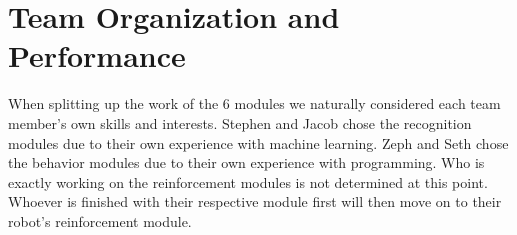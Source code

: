 \section{Team Organization and Performance}

When splitting up the work of the 6 modules we naturally considered each team member’s own skills and interests. Stephen and Jacob chose the recognition modules due to their own experience with machine learning. Zeph and Seth chose the behavior modules due to their own experience with programming. Who is exactly working on the reinforcement modules is not determined at this point. Whoever is finished with their respective module first will then move on to their robot’s reinforcement module. \par 
